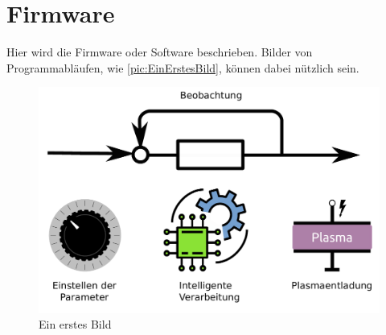 

\section{Firmware}
	
Hier wird die Firmware oder Software beschrieben. Bilder von Programmabläufen, wie \autoref{pic:EinErstesBild}, können dabei nützlich sein.


\begin{figure}[htbp]
	\centering
	\includegraphics[width=0.5\linewidth]{pic/IntelligentesPlasma.pdf}
	\caption{Ein erstes Bild}
	\label{pic:EinErstesBild}
\end{figure}
	
	